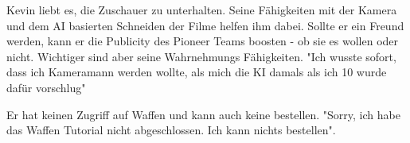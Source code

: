 \begin{npcBox}[title=Kevin\, Kamera]
    \begin{consequences}
    \item {}
    \item {}
    \item {}
    \end{consequences}

    \begin{npcDescription}
    Kevin liebt es, die Zuschauer zu unterhalten. Seine Fähigkeiten mit der Kamera und dem AI basierten Schneiden der Filme helfen ihm dabei. Sollte er ein Freund werden, kann er die Publicity des Pioneer Teams boosten - ob sie es wollen oder nicht. Wichtiger sind aber seine Wahrnehmungs Fähigkeiten.
    "Ich wusste sofort, dass ich Kameramann werden wollte, als mich die KI damals als ich 10 wurde dafür vorschlug"

    Er hat keinen Zugriff auf Waffen und kann auch keine bestellen. "Sorry, ich habe das Waffen Tutorial nicht abgeschlossen. Ich kann nichts bestellen".

    \end{npcDescription}

\end{npcBox}


